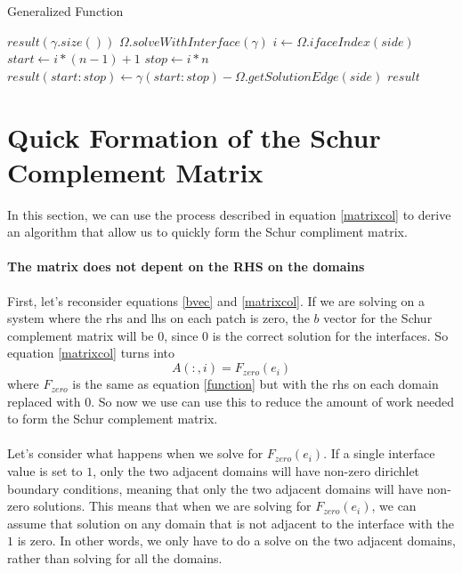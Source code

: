 \documentclass[12pt]{article}
\begin{document}
\begin{algorithm}[H]
\caption{Generalized Function}
\begin{algorithmic}[1]
    \State $result(\gamma.size())$ 
        \State $\Omega.solveWithInterface(\gamma)$
                \State $i \gets \Omega.ifaceIndex(side)$
                \State $start \gets i*(n-1)+1$
                \State $stop \gets i*n$
                \State $result(start:stop) \gets \gamma(start:stop) - \Omega.getSolutionEdge(side)$
            \EndIf
        \EndFor
    \EndFor
    \State \Return $result$
    \EndProcedure
\end{algorithmic}
\end{algorithm}

\section{Quick Formation of the Schur Complement Matrix}
In this section, we can use the process described in equation \eqref{matrixcol} to derive an algorithm
that allow us to quickly form the Schur compliment matrix.
\paragraph{The matrix does not depent on the RHS on the domains}
First, let's reconsider equations  \eqref{bvec} and \eqref{matrixcol}. If we are solving on a system
where the rhs and lhs on each patch is zero, the $b$ vector for the Schur complement matrix will
be $0$, since $0$ is the correct solution for the interfaces. So equation \eqref{matrixcol} turns into
\begin{equation}
    A(:,i) = F_{zero}(e_i)
\end{equation}
where $F_{zero}$ is the same as equation \ref{function} but with the rhs on each domain replaced 
with $0$.
So now we use can use this to reduce the amount of work needed to form the Schur complement matrix.
\\
\\
Let's consider what happens when we solve for $F_{zero}(e_i)$. If a single interface value is set
to $1$, only the two adjacent domains will have non-zero dirichlet boundary conditions, meaning that
only the two adjacent domains will have non-zero solutions. This means that when we are solving for 
$F_{zero}(e_i)$, we can  assume that solution on any domain that is not adjacent to the interface
with the $1$ is zero. In other words, we only have to do a solve on the two adjacent domains, rather
than solving for all the domains.
\end{document}
